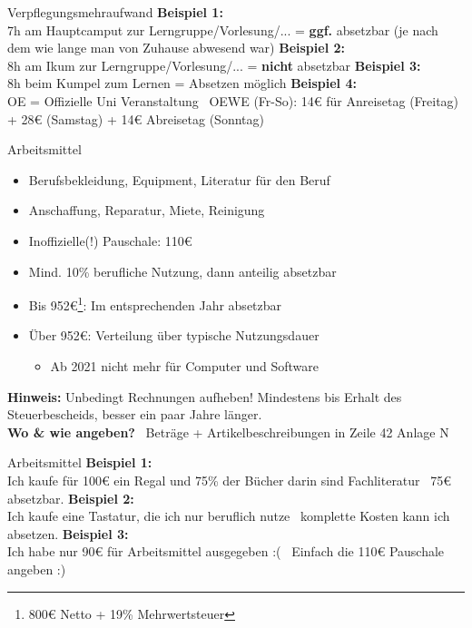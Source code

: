 \documentclass{beamer}
\begin{document}
			\begin{frame}{Verpflegungsmehraufwand}
				\textbf{Beispiel 1:}\\
				7h am Hauptcamput zur Lerngruppe/Vorlesung/... = \textbf{ggf.} absetzbar (je nach dem wie lange man von Zuhause abwesend war)\n\pause
				\textbf{Beispiel 2:}\\
				8h am Ikum zur Lerngruppe/Vorlesung/... = \textbf{nicht} absetzbar\n\pause
				\textbf{Beispiel 3:}\\
				8h beim Kumpel zum Lernen = Absetzen möglich\n\pause
				\textbf{Beispiel 4:}\\
				OE = Offizielle Uni Veranstaltung \textrightarrow\ OEWE (Fr-So): 14€ für Anreisetag (Freitag) + 28€ (Samstag) + 14€ Abreisetag (Sonntag)
			\end{frame}
		
			\begin{frame}{Arbeitsmittel}
				\begin{itemize}
					\item Berufsbekleidung, Equipment, Literatur für den Beruf
					\item Anschaffung, Reparatur, Miete, Reinigung
					\item Inoffizielle(!) Pauschale: 110€
					\item Mind. 10\% berufliche Nutzung, dann anteilig absetzbar
					\item Bis 952€\footnote{800€ Netto + 19\% Mehrwertsteuer}: Im entsprechenden Jahr absetzbar
					\item Über 952€: Verteilung über typische Nutzungsdauer
					\begin{itemize}
						\item Ab 2021 nicht mehr für Computer und Software
					\end{itemize}
				\end{itemize}\pause
				\textbf{Hinweis:} Unbedingt Rechnungen aufheben! Mindestens bis Erhalt des Steuerbescheids, besser ein paar Jahre länger.\\\pause
				\textbf{Wo \& wie angeben?} \textrightarrow\ Beträge + Artikelbeschreibungen in Zeile 42 Anlage N
			\end{frame}
		
			\begin{frame}{Arbeitsmittel}
				\textbf{Beispiel 1:}\\
				Ich kaufe für 100€ ein Regal und 75\% der Bücher darin sind Fachliteratur \textrightarrow\ 75€ absetzbar.\n\pause
				\textbf{Beispiel 2:}\\
				Ich kaufe eine Tastatur, die ich nur beruflich nutze \textrightarrow\ komplette Kosten kann ich absetzen.\n\pause
				\textbf{Beispiel 3:}\\
				Ich habe nur 90€ für Arbeitsmittel ausgegeben :( \textrightarrow\ Einfach die 110€ Pauschale angeben :)
			\end{frame}
			
\end{document}
